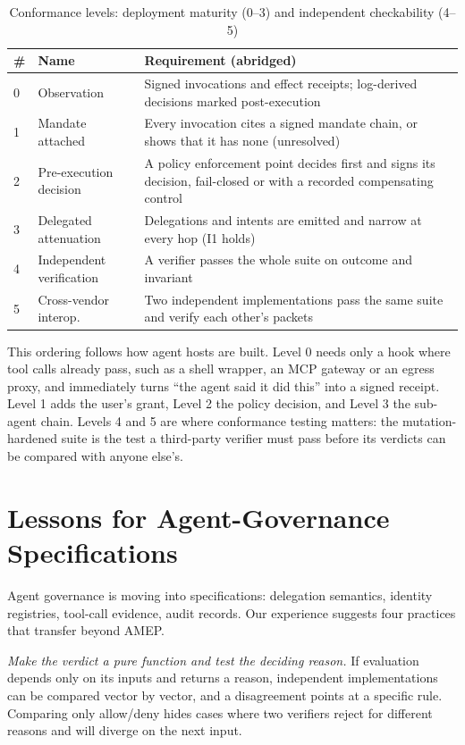 \documentclass[conference]{IEEEtran}
\newcommand{\unres}{\textsf{unresolved}}
\begin{document}
\begin{table}[t]
\caption{Conformance levels: deployment maturity (0--3) and independent checkability (4--5)}\label{tab:levels}
\centering\footnotesize
\begin{tabular}{@{}p{0.3cm}p{2.25cm}p{5.2cm}@{}}
\toprule
\# & Name & Requirement (abridged) \\
\midrule
0 & Observation & Signed invocations and effect receipts; log-derived decisions marked post-execution \\
1 & Mandate attached & Every invocation cites a signed mandate chain, or shows that it has none (\unres{}) \\
2 & Pre-execution decision & A policy enforcement point decides first and signs its decision, fail-closed or with a recorded compensating control \\
3 & Delegated attenuation & Delegations and intents are emitted and narrow at every hop (I1 holds) \\
4 & Independent verification & A verifier passes the whole suite on outcome and invariant \\
5 & Cross-vendor interop. & Two independent implementations pass the same suite and verify each other's packets \\
\bottomrule
\end{tabular}
\end{table}

This ordering follows how agent hosts are built. Level 0 needs only a hook where tool calls already pass, such as a shell wrapper, an MCP gateway or an egress proxy, and immediately turns ``the agent said it did this'' into a signed receipt. Level 1 adds the user's grant, Level 2 the policy decision, and Level 3 the sub-agent chain. Levels 4 and 5 are where conformance testing matters: the mutation-hardened suite is the test a third-party verifier must pass before its verdicts can be compared with anyone else's.

\section{Lessons for Agent-Governance Specifications}

Agent governance is moving into specifications: delegation semantics, identity registries, tool-call evidence, audit records. Our experience suggests four practices that transfer beyond AMEP.

\emph{Make the verdict a pure function and test the deciding reason.} If evaluation depends only on its inputs and returns a reason, independent implementations can be compared vector by vector, and a disagreement points at a specific rule. Comparing only allow/deny hides cases where two verifiers reject for different reasons and will diverge on the next input.
\end{document}
